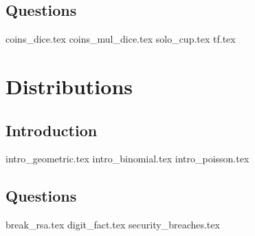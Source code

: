 \documentclass{exam}
\begin{document}
\subsection{Questions}
\begin{questions}
{coins_dice.tex}
{coins_mul_dice.tex}
{solo_cup.tex}
{tf.tex}
\end{questions}

\section{Distributions}
\subsection{Introduction}
{intro_geometric.tex}
{intro_binomial.tex}
{intro_poisson.tex}
\subsection{Questions}
\begin{questions}
{break_rsa.tex}
{digit_fact.tex}
{security_breaches.tex}
\end{questions}
\end{document}
